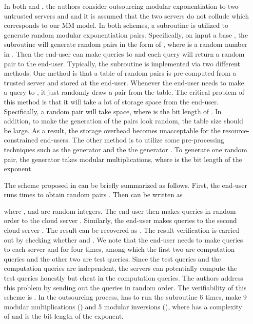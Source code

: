 \documentclass[english,draftcls,onecolumn,11pt]{IEEEtran}
\theoremstyle{definition}
\theoremstyle{plain}
\theoremstyle{plain}
\theoremstyle{definition}
\begin{document}
In both \cite{hohenberger2005securely} and \cite{chen2012new}, the
authors consider outsourcing modular exponentiation to two untrusted
servers  and  and it is assumed that the two servers
do not collude which corresponds to our MM model. In both schemes,
a subroutine  is utilized to generate random modular
exponentiation pairs. Specifically, on input a base ,
the subroutine  will generate random pairs in the
form of , where  is a random
number in . Then the end-user can make queries
to  and each query will return a random pair to the
end-user. Typically, the subroutine  is implemented
via two different methods. One method is that a table of random pairs
is pre-computed from a trusted server and stored at the end-user.
Whenever the end-user needs to make a query to , it
just randomly draw a pair from the table. The critical problem of
this method is that it will take a lot of storage space from the end-user.
Specifically, a random pair will take  space, where 
is the bit length of . In addition, to make the generation of
the pairs look random, the table size should be large. As a result,
the storage overhead becomes unacceptable for the resource-constrained
end-users. The other method is to utilize some pre-processing techniques
such as the  generator \cite{boyko1998speeding} and
the the  generator \cite{nguyen2001distribution}.
To generate one random pair, the  generator takes
 modular multiplications, where 
is the bit length of the exponent. 

The scheme proposed in \cite{hohenberger2005securely} can be briefly
summarized as follows. First, the end-user runs  
times to obtain random pairs 
. Then 
can be written as 

where ,  and  are random
integers. The end-user then makes queries in random order to the cloud
server  .
Similarly, the end-user makes queries to the second cloud server 
.
The result can be recovered as .
The result verification is carried out by checking whether 
and . We note that the end-user needs
to make queries to each server  and  for four times,
among which the first two are computation queries and the other two
are test queries. Since the test queries and the computation queries
are independent, the servers can potentially compute the test queries
honestly but cheat in the computation queries. The authors address
this problem by sending out the queries in random order. The verifiability
of this scheme is . In the outsourcing process, 
has to run the subroutine  6 times, make 9 modular
multiplications () and 5 modular inversions (), where
 has a complexity of  
and  is the bit length of the exponent.
\end{document}
